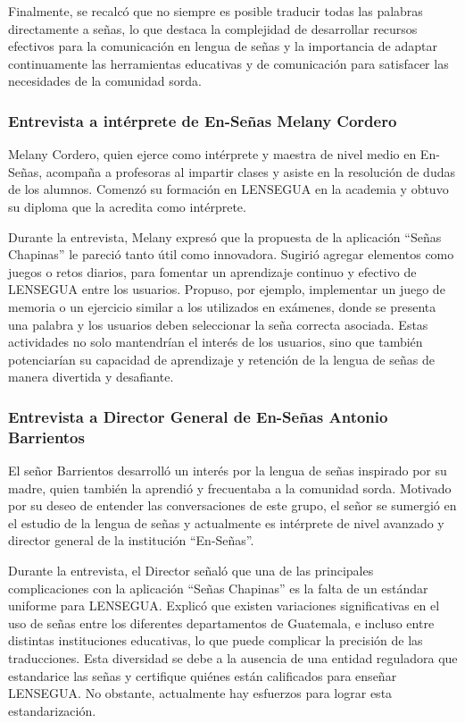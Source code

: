 Finalmente, se recalcó que no siempre es posible traducir todas las palabras directamente a señas, lo que destaca la complejidad de desarrollar recursos efectivos para la comunicación en lengua de señas y la importancia de adaptar continuamente las herramientas educativas y de comunicación para satisfacer las necesidades de la comunidad sorda.


\subsubsection{Entrevista a intérprete de En-Señas Melany Cordero}

Melany Cordero, quien ejerce como intérprete y maestra de nivel medio en En-Señas, acompaña a profesoras al impartir clases y asiste en la resolución de dudas de los alumnos. Comenzó su formación en LENSEGUA en la academia y obtuvo su diploma que la acredita como intérprete.

Durante la entrevista, Melany expresó que la propuesta de la aplicación ``Señas Chapinas'' le pareció tanto útil como innovadora. Sugirió agregar elementos como juegos o retos diarios, para fomentar un aprendizaje continuo y efectivo de LENSEGUA entre los usuarios. Propuso, por ejemplo, implementar un juego de memoria o un ejercicio similar a los utilizados en exámenes, donde se presenta una palabra y los usuarios deben seleccionar la seña correcta asociada. Estas actividades no solo mantendrían el interés de los usuarios, sino que también potenciarían su capacidad de aprendizaje y retención de la lengua de señas de manera divertida y desafiante.


\subsubsection{Entrevista a Director General de En-Señas Antonio Barrientos}

El señor Barrientos desarrolló un interés por la lengua de señas inspirado por su madre, quien también la aprendió y frecuentaba a la comunidad sorda. Motivado por su deseo de entender las conversaciones de este grupo, el señor se sumergió en el estudio de la lengua de señas y actualmente es intérprete de nivel avanzado y director general de la institución ``En-Señas''.

Durante la entrevista, el Director señaló que una de las principales complicaciones con la aplicación ``Señas Chapinas'' es la falta de un estándar uniforme para LENSEGUA. Explicó que existen variaciones significativas en el uso de señas entre los diferentes departamentos de Guatemala, e incluso entre distintas instituciones educativas, lo que puede complicar la precisión de las traducciones. Esta diversidad se debe a la ausencia de una entidad reguladora que estandarice las señas y certifique quiénes están calificados para enseñar LENSEGUA. No obstante, actualmente hay esfuerzos para lograr esta estandarización.

